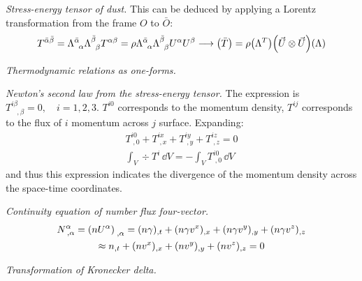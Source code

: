 \documentclass{report}
\begin{document}
\begin{subquests}
	\item \emph{Stress-energy tensor of dust.}
	This can be deduced by applying a Lorentz transformation from the frame $O$ to $\bar O$:
	\begin{gather*}
		T^{\bar \alpha \bar \beta} = \Lambda^{\bar \alpha}_{\;\;\alpha}\Lambda^{\bar \beta}_{\;\;\beta} T^{\alpha\beta} = \rho \Lambda^{\bar \alpha}_{\;\;\alpha}\Lambda^{\bar \beta}_{\;\;\beta} U^{\alpha} U^{\beta} \longrightarrow \pqty{\bar T} = \rho\pqty{\Lambda^T}\pqty{\vec U \otimes \vec U}\pqty{\Lambda}
	\end{gather*}

	\item \emph{Thermodynamic relations as one-forms.}

	\item \emph{Newton's second law from the stress-energy tensor.}
	The expression is $T^{i\beta}_{\;\;\;,\beta} = 0, \quad i = 1,2,3$. $T^{i0}$ corresponds to the momentum density, $T^{ij}$ corresponds to the flux of $i$ momentum across $j$ surface. Expanding:
	\begin{gather*}
		T^{i0}_{\;,0} + T^{ix}_{\;,x} + T^{iy}_{\;,y} + T^{iz}_{\;,z} = 0 \\
		\int_{V} \div{T^i}\,\dd{V} = -\int_V T^{i0}_{\;,0}\,\dd{V}
	\end{gather*}
	and thus this expression indicates the divergence of the momentum density across the space-time coordinates.

	\item \emph{Continuity equation of number flux four-vector.}
	\begin{gather*}
		N^{\alpha}_{\;,\alpha} = \pqty{nU^{\alpha}}_{\;,\alpha} = (n\gamma)_{,t} + (n\gamma v^x)_{,x} + (n\gamma v^y)_{,y} + (n\gamma v^z)_{,z} \\
		 \approx n_{,t} + (nv^x)_{,x} + (nv^y)_{,y} + (nv^z)_{,z} = 0
	\end{gather*}

	\item \emph{Transformation of Kronecker delta.}
	\begin{subquests}
		\item

		\item
	\end{subquests}


\end{subquests}
\end{document}

